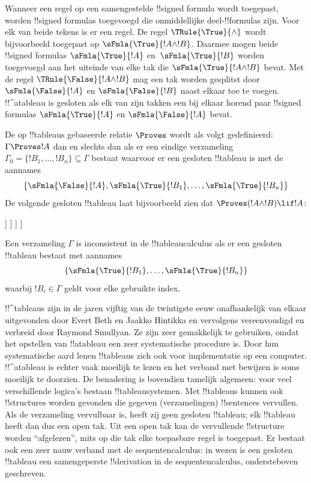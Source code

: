 \documentclass[openany]{memoir}
\begin{document}
Wanneer een regel op een samengestelde !!{signed formula} wordt
toegepast, worden !!{signed formula}s toegevoegd die onmiddellijke
deel-!!{formula}s zijn. Voor elk van beide tekens is er een regel. De
regel $\TRule{\True}{\land}$ wordt bijvoorbeeld toegepast op
$\sFmla{\True}{!A \land !B}$. Daarmee mogen beide !!{signed formula}s
$\sFmla{\True}{!A}$ en~$\sFmla{\True}{!B}$ worden toegevoegd aan het
uiteinde van elke tak die $\sFmla{\True}{!A \land !B}$ bevat. Met de
regel $\TRule{\False}{!A \land !B}$ mag een tak worden gesplitst door
$\sFmla{\False}{!A}$ en $\sFmla{\False}{!B}$ naast elkaar toe te
voegen. !!^a{tableau} is gesloten als elk van zijn takken een bij
elkaar horend paar !!{signed formula}s $\sFmla{\True}{!A}$ en
$\sFmla{\False}{!A}$ bevat.

De op !!{tableau}s gebaseerde relatie $\Proves$ wordt als volgt
gedefinieerd: $\Gamma \Proves !A$ dan en slechts dan als er een eindige
verzameling~$\Gamma_0 = \{!B_1, \dots, !B_n\} \subseteq \Gamma$ bestaat
waarvoor er een gesloten !!{tableau} is met de aannames
\[
\{\sFmla{\False}{!A}, \sFmla{\True}{!B_1}, \dots, \sFmla{\True}{!B_n}\} 
\]
De volgende gesloten !!{tableau} laat bijvoorbeeld zien dat $\Proves
(!A \land !B) \lif !A$:
\begin{oltableau}
  [\sFmla{\False}{(\formula{A} \land \formula{B}) \lif \formula{A}}, just = \TAss
    [\sFmla{\True}{\formula{A} \land \formula{B}}, just = {\TRule{\False}{\lif}[1]}
      [\sFmla{\False}{\formula{A}}, just = {\TRule{\False}{\lif}[1]}
        [\sFmla{\True}{\formula{A}}, just = {\TRule{\True}{\lif}[2]}
          [\sFmla{\True}{\formula{B}}, just = {\TRule{\True}{\lif}[2]}, close]
        ]
      ]
    ]
  ]
\end{oltableau}

Een verzameling $\Gamma$ is inconsistent in de !!{tableau}calculus als
er een gesloten !!{tableau} bestaat met aannames
\[
\{\sFmla{\True}{!B_1}, \dots, \sFmla{\True}{!B_n}\} 
\]
waarbij $!B_i \in \Gamma$ geldt voor elke gebruikte index.

!!^{tableau}s zijn in de jaren vijftig van de twintigste eeuw
onafhankelijk van elkaar uitgevonden door Evert Beth en Jaakko
Hintikka en vervolgens vereenvoudigd en verbreid door Raymond
Smullyan. Ze zijn zeer gemakkelijk te gebruiken, omdat het opstellen
van !!a{tableau} een zeer systematische procedure is. Door hun
systematische aard lenen !!{tableau}s zich ook voor implementatie op
een computer. !!^a{tableau} is echter vaak moeilijk te lezen en het
verband met bewijzen is soms moeilijk te doorzien. De benadering is
bovendien tamelijk algemeen: voor veel verschillende logica's bestaan
!!{tableau}systemen. Met !!{tableau}s kunnen ook !!{structure}s worden
gevonden die gegeven (verzamelingen) !!{sentence}s vervullen. Als de
verzameling vervulbaar is, heeft zij geen gesloten !!{tableau}; elk
!!{tableau} heeft dan dus een open tak. Uit een open tak kan de
vervullende !!{structure} worden ``afgelezen'', mits op die tak elke
toepasbare regel is toegepast. Er bestaat ook een zeer nauw verband
met de sequentencalculus: in wezen is een gesloten !!{tableau} een
samengeperste !!{derivation} in de sequentencalculus, ondersteboven
geschreven.
\endgroup
\end{document}
